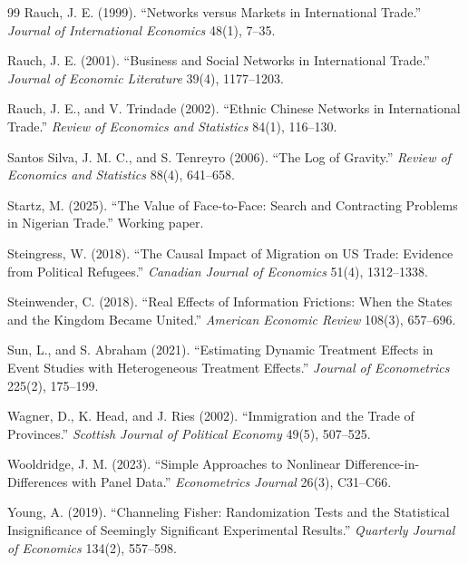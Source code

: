 \documentclass[12pt]{article}
\theoremstyle{remark}
\begin{document}
\begin{thebibliography}{99}
Rauch, J. E. (1999). ``Networks versus Markets in International Trade.'' \textit{Journal of International Economics} 48(1), 7--35.

Rauch, J. E. (2001). ``Business and Social Networks in International Trade.'' \textit{Journal of Economic Literature} 39(4), 1177--1203.

Rauch, J. E., and V. Trindade (2002). ``Ethnic Chinese Networks in International Trade.'' \textit{Review of Economics and Statistics} 84(1), 116--130.

Santos Silva, J. M. C., and S. Tenreyro (2006). ``The Log of Gravity.'' \textit{Review of Economics and Statistics} 88(4), 641--658.

Startz, M. (2025). ``The Value of Face-to-Face: Search and Contracting Problems in Nigerian Trade.'' Working paper.

Steingress, W. (2018). ``The Causal Impact of Migration on US Trade: Evidence from Political Refugees.'' \textit{Canadian Journal of Economics} 51(4), 1312--1338.

Steinwender, C. (2018). ``Real Effects of Information Frictions: When the States and the Kingdom Became United.'' \textit{American Economic Review} 108(3), 657--696.

Sun, L., and S. Abraham (2021). ``Estimating Dynamic Treatment Effects in Event Studies with Heterogeneous Treatment Effects.'' \textit{Journal of Econometrics} 225(2), 175--199.

Wagner, D., K. Head, and J. Ries (2002). ``Immigration and the Trade of Provinces.'' \textit{Scottish Journal of Political Economy} 49(5), 507--525.

Wooldridge, J. M. (2023). ``Simple Approaches to Nonlinear Difference-in-Differences with Panel Data.'' \textit{Econometrics Journal} 26(3), C31--C66.

Young, A. (2019). ``Channeling Fisher: Randomization Tests and the Statistical Insignificance of Seemingly Significant Experimental Results.'' \textit{Quarterly Journal of Economics} 134(2), 557--598.

\end{thebibliography}
\end{document}
